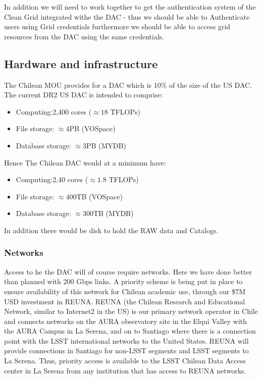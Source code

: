 In addition we will need to work together to get the authentication system of the Clean Grid integrated withe the DAC - thus we should be able to Authenticate users using Grid credentials furthermore we should be able to access grid resources from the DAC using the same credentials.


\subsection{Hardware and infrastructure}
The Chilean MOU provides for a DAC which is 10\% of the size of the US DAC. The current DR2 US DAC is intended to comprise:
\begin{itemize}
\item Computing:2,400 cores ($\approx 18$ TFLOPs)
\item File storage: $\approx 4 $PB  (VOSpace)
\item Database storage: $\approx 3 $PB (MYDB)

\end{itemize}

Hence The Chilean DAC would at a minimum have:
\begin{itemize}
\item Computing:2,40 cores ($\approx 1.8$ TFLOPs)
\item File storage: $\approx 400 $TB  (VOSpace)
\item Database storage: $\approx 300 $TB (MYDB)

\end{itemize}

In addition there would be disk to hold the RAW data and Catalogs.

\subsubsection{Networks}
Access to he the DAC will of course require networks. Here we have done better than planned with 200 Gbps links.
A priority scheme is being put in place to ensure availability of this network  for Chilean academic use, through our  \$7M USD investment in REUNA.
REUNA (the Chilean Research and Educational Network, similar to Internet2 in the US) is our primary network operator in Chile and connects networks on the AURA observatory site in the Elqui Valley with the AURA Campus in La Serena, and on to Santiago where there is a connection point with the LSST international networks to the United States.
REUNA will provide connections in Santiago for non-LSST segments and LSST segments to La Serena. Thus, priority access is available to the LSST Chilean Data Access center in La Serena from any institution that has access to REUNA networks.

